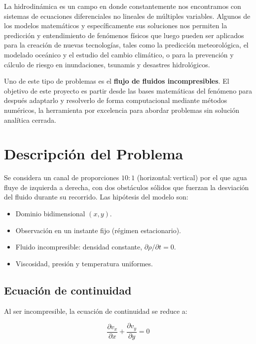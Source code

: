 \documentclass[12pt, a4paper]{article}
\begin{document}
La hidrodinámica es un campo en donde constantemente nos encontramos con sistemas
de ecuaciones diferenciales no lineales de múltiples variables. Algunos de los
modelos matemáticos y específicamente sus soluciones nos permiten la predicción y
entendimiento de fenómenos físicos que luego pueden ser aplicados para la creación
de nuevas tecnologías, tales como la predicción meteorológica, el modelado oceánico
y el estudio del cambio climático, o para la prevención y cálculo de riesgo en
inundaciones, tsunamis y desastres hidrológicos.

Uno de este tipo de problemas es el \textbf{flujo de fluidos incompresibles}. El
objetivo de este proyecto es partir desde las bases matemáticas del fenómeno para
después adaptarlo y resolverlo de forma computacional mediante métodos numéricos,
la herramienta por excelencia para abordar problemas sin solución analítica cerrada.

\section{Descripción del Problema}

Se considera un canal de proporciones $10\!:\!1$ (horizontal$:$vertical) por el
que agua fluye de izquierda a derecha, con dos obstáculos sólidos que fuerzan la
desviación del fluido durante su recorrido. Las hipótesis del modelo son:

\begin{itemize}
  \item Dominio bidimensional $(x, y)$.
  \item Observación en un instante fijo (régimen estacionario).
  \item Fluido incompresible: densidad constante, $\partial\rho/\partial t = 0$.
  \item Viscosidad, presión y temperatura uniformes.
\end{itemize}

\subsection{Ecuación de continuidad}

Al ser incompresible, la ecuación de continuidad se reduce a:

\begin{equation}
  \frac{\partial v_x}{\partial x} + \frac{\partial v_y}{\partial y} = 0
\end{equation}
\end{document}
